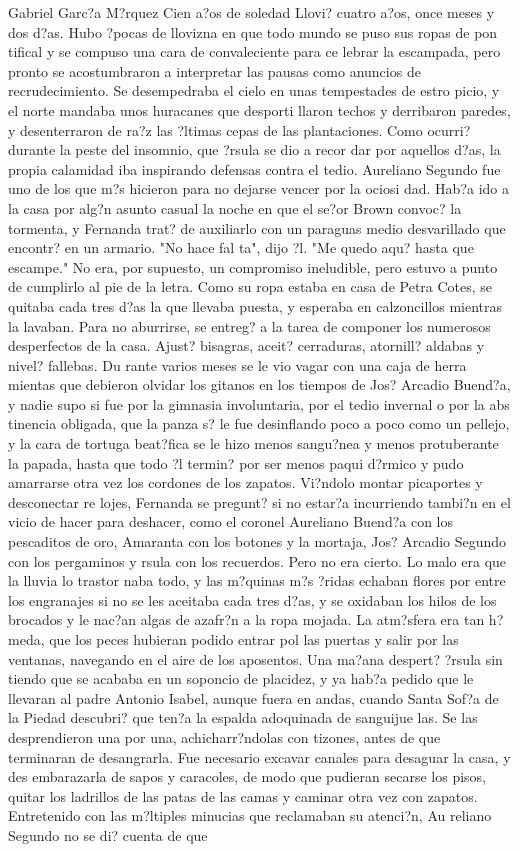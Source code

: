 Gabriel Garc?a M?rquez Cien a?os de soledad Llovi? cuatro a?os, once meses y dos d?as. Hubo ?pocas de llovizna en que todo mundo se puso sus ropas de pon tifical y se compuso una cara de convaleciente para ce lebrar la escampada, pero pronto se acostumbraron a interpretar las pausas como anuncios de recrudecimiento. Se desempedraba el cielo en unas tempestades de estro picio, y el norte mandaba unos huracanes que desporti llaron techos y derribaron paredes, y desenterraron de ra?z las ?ltimas cepas de las plantaciones. Como ocurri? durante la peste del insomnio, que ?rsula se dio a recor dar por aquellos d?as, la propia calamidad iba inspirando defensas contra el tedio. Aureliano Segundo fue uno de los que m?s hicieron para no dejarse vencer por la ociosi dad. Hab?a ido a la casa por alg?n asunto casual la noche en que el se?or Brown convoc? la tormenta, y Fernanda trat? de auxiliarlo con un paraguas medio desvarillado que encontr? en un armario. "No hace fal ta", dijo ?l. "Me quedo aqu? hasta que escampe." No era, por supuesto, un compromiso ineludible, pero estuvo a punto de cumplirlo al pie de la letra. Como su ropa estaba en casa de Petra Cotes, se quitaba cada tres d?as la que llevaba puesta, y esperaba en calzoncillos mientras la lavaban. Para no aburrirse, se entreg? a la tarea de componer los numerosos desperfectos de la casa. Ajust? bisagras, aceit? cerraduras, atornill? aldabas y nivel? fallebas. Du rante varios meses se le vio vagar con una caja de herra mientas que debieron olvidar los gitanos en los tiempos de Jos? Arcadio Buend?a, y nadie supo si fue por la gimnasia involuntaria, por el tedio invernal o por la abs tinencia obligada, que la panza s? le fue desinflando poco a poco como un pellejo, y la cara de tortuga beat?fica se le hizo menos sangu?nea y menos protuberante la papada, hasta que todo ?l termin? por ser menos paqui d?rmico y pudo amarrarse otra vez los cordones de los zapatos. Vi?ndolo montar picaportes y desconectar re lojes, Fernanda se pregunt? si no estar?a incurriendo tambi?n en el vicio de hacer para deshacer, como el coronel Aureliano Buend?a con los pescaditos de oro, Amaranta con los botones y la mortaja, Jos? Arcadio Segundo con los pergaminos y rsula con los recuerdos. Pero no era cierto. Lo malo era que la lluvia lo trastor naba todo, y las m?quinas m?s ?ridas echaban flores por entre los engranajes si no se les aceitaba cada tres d?as, y se oxidaban los hilos de los brocados y le nac?an algas de azafr?n a la ropa mojada. La atm?sfera era tan h?meda, que los peces hubieran podido entrar pol las puertas y salir por las ventanas, navegando en el aire de los aposentos. Una ma?ana despert? ?rsula sin tiendo que se acababa en un soponcio de placidez, y ya hab?a pedido que le llevaran al padre Antonio Isabel, aunque fuera en andas, cuando Santa Sof?a de la Piedad descubri? que ten?a la espalda adoquinada de sanguijue las. Se las desprendieron una por una, achicharr?ndolas con tizones, antes de que terminaran de desangrarla. Fue necesario excavar canales para desaguar la casa, y des embarazarla de sapos y caracoles, de modo que pudieran secarse los pisos, quitar los ladrillos de las patas de las camas y caminar otra vez con zapatos. Entretenido con las m?ltiples minucias que reclamaban su atenci?n, Au reliano Segundo no se di? cuenta de que 